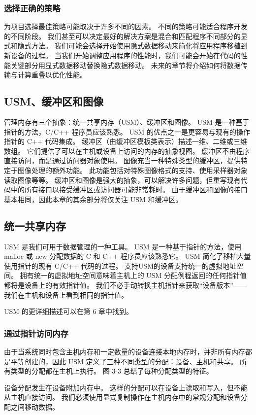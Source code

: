 \subsubsection{选择正确的策略}
为项目选择最佳策略可能取决于许多不同的因素。 不同的策略可能适合程序开发的不同阶段。 我们甚至可以决定最好的解决方案是混合和匹配程序不同部分的显式和隐式方法。 我们可能会选择开始使用隐式数据移动来简化将应用程序移植到新设备的过程。 当我们开始调整应用程序的性能时，我们可能会开始在代码的性能关键部分用显式数据移动替换隐式数据移动。 未来的章节将介绍如何将数据传输与计算重叠以优化性能。

\subsection{USM、缓冲区和图像}
管理内存有三个抽象：统一共享内存（USM）、缓冲区和图像。 USM 是一种基于指针的方法，C/C++ 程序员应该熟悉。 USM 的优点之一是更容易与现有的操作指针的 C++ 代码集成。 缓冲区（由缓冲区模板类表示）描述一维、二维或三维数组。 它们提供了可以在主机或设备上访问的内存的抽象视图。 缓冲区不由程序直接访问，而是通过访问器对象使用。 图像充当一种特殊类型的缓冲区，提供特定于图像处理的额外功能。 此功能包括对特殊图像格式的支持、使用采样器对象读取图像等等。 缓冲区和图像是强大的抽象，可以解决许多问题，但重写现有代码中的所有接口以接受缓冲区或访问器可能非常耗时。 由于缓冲区和图像的接口基本相同，因此本章的其余部分将仅关注 USM 和缓冲区。

\subsection{统一共享内存}
USM 是我们可用于数据管理的一种工具。 USM 是一种基于指针的方法，使用 malloc 或 new 分配数据的 C 和 C++ 程序员应该熟悉它。 USM 简化了移植大量使用指针的现有 C/C++ 代码的过程。 支持USM的设备支持统一的虚拟地址空间。 拥有统一的虚拟地址空间意味着主机上的 USM 分配例程返回的任何指针值都将是设备上的有效指针值。 我们不必手动转换主机指针来获取“设备版本”——我们在主机和设备上看到相同的指针值。

USM 的更详细描述可以在第 6 章中找到。

\subsubsection{通过指针访问内存}
由于当系统同时包含主机内存和一定数量的设备连接本地内存时，并非所有内存都是平等创建的，因此 USM 定义了三种不同类型的分配：设备、主机和共享。 所有类型的分配都在主机上执行。 图 3-3 总结了每种分配类型的特征。

设备分配发生在设备附加内存中。 这样的分配可以在设备上读取和写入，但不能从主机直接访问。 我们必须使用显式复制操作在主机内存中的常规分配和设备分配之间移动数据。

